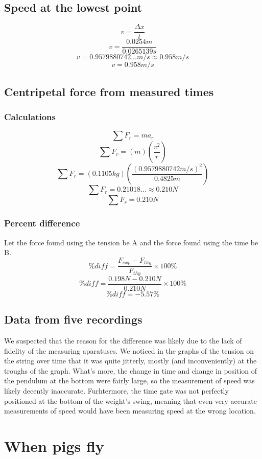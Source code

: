 \documentclass[11pt, letterpaper, includehead]{article}
\begin{document}
\subsection{Speed at the lowest point}


$$v = \frac{\Delta x}{t}$$
$$v = \frac{0.0254 m}{0.0265139s}$$
$$v = 0.9579880742...m/s \approx 0.958 m/s$$
$$\boxed{v = 0.958 m/s}$$

\subsection{Centripetal force from measured times}
\subsubsection{Calculations}
$$\sum F_r = ma_r$$
$$\sum F_r = (m)\left( \frac{v^2}{r}\right)$$
$$\sum F_r = (0.1105 kg)\left( \frac{(0.9579880742m/s)^2}{0.4825 m}\right)$$
$$\sum F_r = 0.21018...\approx 0.210N$$
$$\boxed{\sum F_r = 0.210N}$$

\subsubsection{Percent difference}
Let the force found using the tension be A and the force found using the time be B.
$$\%diff = \frac{F_{exp} - F_{thy}}{F_{thy}}\times 100\%$$
$$\%diff = \frac{0.198N - 0.210N}{0.210N}\times100\%$$
$$\%diff = -5.57\%$$

\subsection{Data from five recordings}

We suspected that the reason for the difference was likely due to the lack of fidelity
of the measuring aparatuses. We noticed in the graphs of the tension on the string over
time that it was quite jitterly, mostly (and inconveniently) at the troughs of the graph.
What's more, the change in time and change in position of the pendulum at the bottom were
fairly large, so the measurement of speed was likely decently inaccurate. Furhtermore, the 
time gate was not perfectly positioned at the bottom of the weight's swing, meaning that
even very accurate measurements of speed would have been measuring speed at the wrong location.

\section{When pigs fly}
\end{document}
